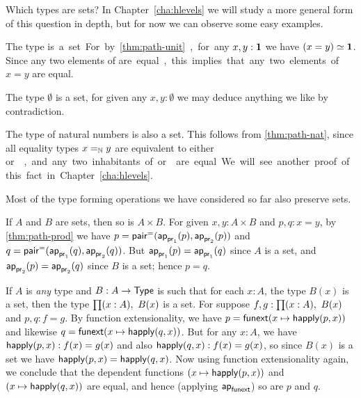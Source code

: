 Which types are sets?
In Chapter~\ref{cha:hlevels} we will study a more general form of this question in depth, but for now we can observe some easy examples.

\begin{eg}
  The type \unit is a set.
  For by \autoref{thm:path-unit}, for any $x,y:\unit$ we have $\eqv{(x=y)}{\unit}$.
  Since any two elements of \unit are equal, this implies that any two elements of $x=y$ are equal.
\end{eg}

\begin{eg}
  The type $\emptyset$ is a set, for given any $x,y:\emptyset$ we may deduce anything we like by contradiction.
\end{eg}

\begin{eg}
  The type \nat of natural numbers is also a set.
  This follows from \autoref{thm:path-nat}, since all equality types $\id[\nat]xy$ are equivalent to either \unit or \emptyt, and any two inhabitants of \unit or \emptyt are equal.
  We will see another proof of this fact in Chapter~\ref{cha:hlevels}.
\end{eg}

Most of the type forming operations we have considered so far also preserve sets.

\begin{eg}\label{thm:isset-prod}
  If $A$ and $B$ are sets, then so is $A\times B$.
  For given $x,y:A\times B$ and $p,q:x=y$, by \autoref{thm:path-prod} we have $p= \pairpath(\projpath1(p),\projpath2(p))$ and $q= \pairpath(\projpath1(q),\projpath2(q))$.
  But $\projpath1(p)=\projpath1(q)$ since $A$ is a set, and $\projpath2(p)=\projpath2(q)$ since $B$ is a set; hence $p=q$.
\end{eg}

\begin{eg}\label{thm:isset-forall}
  If $A$ is \emph{any} type and $B:A\to \type$ is such that for each $x:A$, the type $B(x)$ is a set, then the type $\prd{x:A} B(x)$ is a set.
  For suppose $f,g:\prd{x:A} B(x)$ and $p,q:f=g$.
  By function extensionality, we have $p = {\funext (x \mapsto \happly(p,x))}$ and likewise $q = {\funext (x \mapsto \happly(q,x))}$.
  But for any $x:A$, we have $\happly(p,x):f(x)=g(x)$ and also $\happly(q,x):f(x)=g(x)$, so since $B(x)$ is a set we have $\happly(p,x) = \happly(q,x)$.
  Now using function extensionality again, we conclude that the dependent functions $(x \mapsto \happly(p,x))$ and $(x \mapsto \happly(q,x))$ are equal, and hence (applying $\apfunc{\funext}$) so are $p$ and $q$.
\end{eg}

